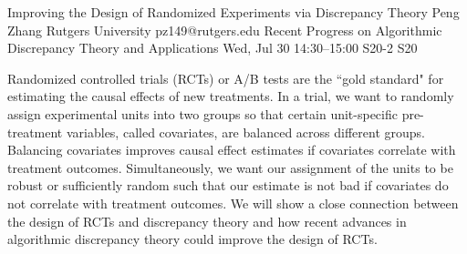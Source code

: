 \begin{talk}
  {Improving the Design of Randomized Experiments via Discrepancy Theory}%
  {Peng Zhang}%
  {Rutgers University}%
  {pz149@rutgers.edu}%
  {Recent Progress on Algorithmic Discrepancy Theory and Applications}%
  {}%
  {Wed, Jul 30 14:30--15:00}%
  {S20-2}%
  {S20}%
    
   
Randomized controlled trials (RCTs) or A/B tests are the ``gold standard" for estimating the causal effects of new treatments. In a trial, we want to randomly assign experimental units into two groups so that certain unit-specific pre-treatment variables, called covariates, are balanced across different groups. Balancing covariates improves causal effect estimates if covariates correlate with treatment outcomes. Simultaneously, we want our assignment of the units to be robust or sufficiently random such that our estimate is not bad if covariates do not correlate with treatment outcomes. We will show a close connection between the design of RCTs and discrepancy theory and how recent advances in algorithmic discrepancy theory could improve the design of RCTs.

\medskip


\end{talk}


